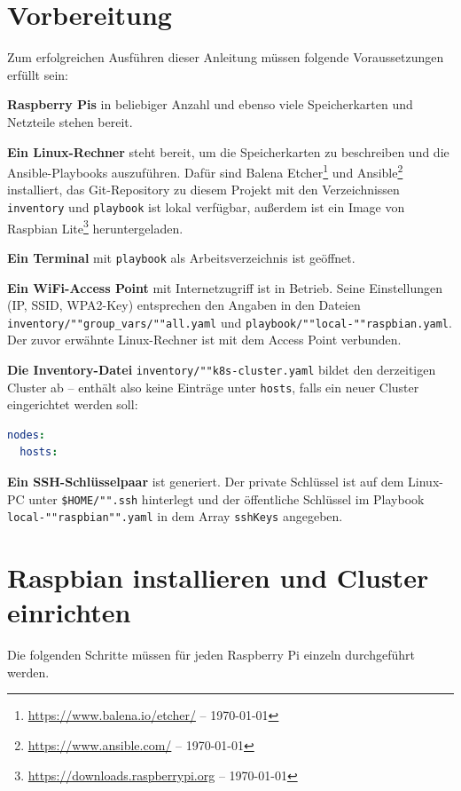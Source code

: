 \section{Vorbereitung}\label{sec:vorbereitung}
Zum erfolgreichen Ausführen dieser Anleitung müssen folgende Voraussetzungen erfüllt sein:

\textbf{Raspberry Pis} in beliebiger Anzahl und ebenso viele Speicherkarten und Netzteile stehen bereit.

\textbf{Ein Linux-Rechner} steht bereit, um die Speicherkarten zu beschreiben und die Ansible-Playbooks auszuführen. Dafür sind Balena Etcher\footnote{\url{https://www.balena.io/etcher/} -- \today} und Ansible\footnote{\url{https://www.ansible.com/} -- \today} installiert, das Git-Repository zu diesem Projekt mit den Verzeichnissen \texttt{inventory} und \texttt{playbook} ist lokal verfügbar, außerdem ist ein Image von Raspbian Lite\footnote{\url{https://downloads.raspberrypi.org} -- \today} heruntergeladen.

\textbf{Ein Terminal} mit \texttt{playbook} als Arbeitsverzeichnis ist geöffnet.

\textbf{Ein WiFi-Access Point} mit Internetzugriff ist in Betrieb. Seine Einstellungen (IP, SSID, WPA2-Key) entsprechen den Angaben in den Dateien \texttt{inventory/""group\_vars/""all.yaml} und \texttt{playbook/""local-""raspbian.yaml}. Der zuvor erwähnte Linux-Rechner ist mit dem Access Point verbunden.

\textbf{Die Inventory-Datei} \texttt{inventory/""k8s-cluster.yaml} bildet den derzeitigen Cluster ab -- enthält also keine Einträge unter \texttt{hosts}, falls ein neuer Cluster eingerichtet werden soll:

\begin{lstlisting}[language=yaml, caption=Leere Inventory-Datei]
nodes:
  hosts:
\end{lstlisting}

\textbf{Ein SSH-Schlüsselpaar} ist generiert. Der private Schlüssel ist auf dem Linux-PC unter \texttt{\$HOME/"".ssh} hinterlegt und der öffentliche Schlüssel im Playbook \texttt{local-""raspbian"".yaml} in dem Array \texttt{sshKeys} angegeben.

\section{Raspbian installieren und Cluster einrichten}\label{sec:raspbian-installieren}
Die folgenden Schritte müssen für jeden Raspberry Pi einzeln durchgeführt werden.

